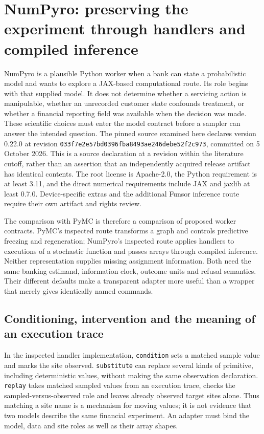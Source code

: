 \section{NumPyro: preserving the experiment through handlers and compiled inference}
\label{sec:exec23-numpyro-worker}

NumPyro is a plausible Python worker when a bank can state a probabilistic model and wants to explore a JAX-based computational route. Its role begins with that supplied model. It does not determine whether a servicing action is manipulable, whether an unrecorded customer state confounds treatment, or whether a financial reporting field was available when the decision was made. These scientific choices must enter the model contract before a sampler can answer the intended question. The pinned source examined here declares version 0.22.0 at revision \texttt{033f7e2e57bd0396fba8493ae246debe52f2c973}, committed on 5 October 2026. This is a source declaration at a revision within the literature cutoff, rather than an assertion that an independently acquired release artifact has identical contents. The root license is Apache-2.0, the Python requirement is at least 3.11, and the direct numerical requirements include JAX and jaxlib at least 0.7.0. Device-specific extras and the additional Funsor inference route require their own artifact and rights review. \cite{exec23_numpyro_sources}

The comparison with PyMC is therefore a comparison of proposed worker contracts. PyMC's inspected route transforms a graph and controls predictive freezing and regeneration; NumPyro's inspected route applies handlers to executions of a stochastic function and passes arrays through compiled inference. Neither representation supplies missing assignment information. Both need the same banking estimand, information clock, outcome units and refusal semantics. Their different defaults make a transparent adapter more useful than a wrapper that merely gives identically named commands. \cite{exec23_pymc_sources,exec23_numpyro_sources}

\subsection{Conditioning, intervention and the meaning of an execution trace}

In the inspected handler implementation, \texttt{condition} sets a matched sample value and marks the site observed. \texttt{substitute} can replace several kinds of primitive, including deterministic values, without making the same observation declaration. \texttt{replay} takes matched sampled values from an execution trace, checks the sampled-versus-observed role and leaves already observed target sites alone. Thus matching a site name is a mechanism for moving values; it is not evidence that two models describe the same financial experiment. An adapter must bind the model, data and site roles as well as their array shapes. \cite{exec23_numpyro_sources}

